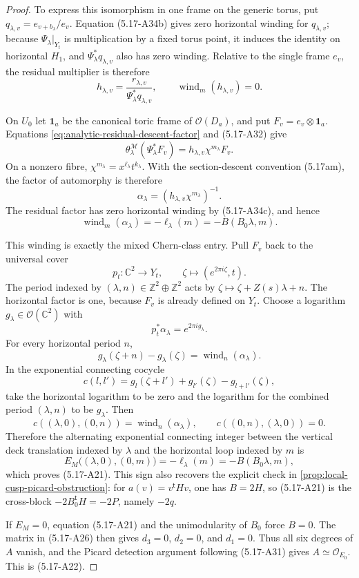 \begin{proof}
To express this isomorphism in one frame on the generic torus, put
\(q_{\lambda,v}=e_{v+b_\lambda}/e_v\).  Equation (5.17-A34b) gives zero
horizontal winding for \(q_{\lambda,v}\); because
\(\Psi_\lambda|_{Y_t}\) is multiplication by a fixed torus point, it
induces the identity on horizontal \(H_1\), and
\(\Psi_\lambda^*q_{\lambda,v}\) also has zero winding.  Relative to the
single frame \(e_v\), the residual multiplier is therefore
\[
 h_{\lambda,v}
 =\frac{r_{\lambda,v}}{\Psi_\lambda^*q_{\lambda,v}},
 \qquad
 \operatorname{wind}_m(h_{\lambda,v})=0.
\tag{5.17-A34c}
\]

On \(U_0\) let \(\mathbf1_a\) be the canonical toric frame of
\(\mathcal O(D_a)\), and put \(F_v=e_v\otimes\mathbf1_a\).  Equations
\cref{eq:analytic-residual-descent-factor} and (5.17-A32) give
\[
 \theta^{\mathcal M}_\lambda(\Psi_\lambda^*F_v)
 =h_{\lambda,v}\chi^{m_\lambda}F_v.
\]
On a nonzero fibre, \(\chi^{m_\lambda}=x^{\ell_\lambda}t^{k_\lambda}\).
With the section-descent convention (5.17am), the factor of automorphy is
therefore
\[
 \alpha_\lambda=(h_{\lambda,v}\chi^{m_\lambda})^{-1}.
\]
The residual factor has zero horizontal winding by (5.17-A34c), and hence
\begin{equation}
 \operatorname{wind}_m(\alpha_\lambda)
 =-\ell_\lambda(m)=-B(B_0\lambda,m).
\label{eq:analytic-factor-horizontal-winding}
\end{equation}

This winding is exactly the mixed Chern-class entry.  Pull \(F_v\) back to
the universal cover
\[
 p_t:\mathbb C^2\longrightarrow Y_t,
 \qquad \zeta\longmapsto(e^{2\pi i\zeta},t).
\]
The period indexed by \((\lambda,n)\in\mathbb Z^2\oplus\mathbb Z^2\)
acts by \(\zeta\mapsto\zeta+Z(s)\lambda+n\).  The horizontal factor is one,
because \(F_v\) is already defined on \(Y_t\).  Choose a logarithm
\(g_\lambda\in\mathcal O(\mathbb C^2)\) with
\[
 p_t^*\alpha_\lambda=e^{2\pi i g_\lambda}.
\]
For every horizontal period \(n\),
\[
 g_\lambda(\zeta+n)-g_\lambda(\zeta)
 =\operatorname{wind}_n(\alpha_\lambda).
\]
In the exponential connecting cocycle
\[
 c(l,l')=g_l(\zeta+l')+g_{l'}(\zeta)-g_{l+l'}(\zeta),
\]
take the horizontal logarithm to be zero and the logarithm for the combined
period \((\lambda,n)\) to be \(g_\lambda\).  Then
\[
 c((\lambda,0),(0,n))
 =\operatorname{wind}_n(\alpha_\lambda),
 \qquad
 c((0,n),(\lambda,0))=0.
\]
Therefore the alternating exponential connecting integer between
the vertical deck
translation indexed by \(\lambda\) and the horizontal loop indexed by
\(m\) is
\[
 E_M\bigl((\lambda,0),(0,m)\bigr)
 =-\ell_\lambda(m)
 =-B(B_0\lambda,m),
\]
which proves (5.17-A21).  This sign also recovers the explicit check in
\cref{prop:local-cusp-picard-obstruction}: for
\(a(v)=v^{\mathsf t}Hv\), one has \(B=2H\), so (5.17-A21) is the
cross-block \(-2B_0^{\mathsf t}H=-2P\), namely \(-2q\).

If \(E_M=0\), equation (5.17-A21) and the unimodularity of \(B_0\) force
\(B=0\).  The matrix in (5.17-A26) then gives
\(d_3=0\), \(d_2=0\), and \(d_1=0\).  Thus all six degrees of \(A\)
vanish, and the Picard detection argument following (5.17-A31) gives
\(A\simeq\mathcal O_{E_0}\).  This is (5.17-A22).
\end{proof}

